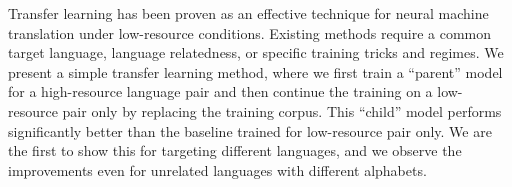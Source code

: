 Transfer learning has been proven as an effective technique for neural machine translation under low-resource conditions. Existing methods require a common target language, language relatedness, or specific training tricks and regimes. We present a simple transfer learning method, where we first train a ``parent'' model for a high-resource language pair and then continue the training on a low-resource pair only by replacing the training corpus. This ``child'' model performs significantly better than the baseline trained for low-resource pair only. We are the first to show this for targeting different languages, and we observe the improvements even for unrelated languages with different alphabets.

